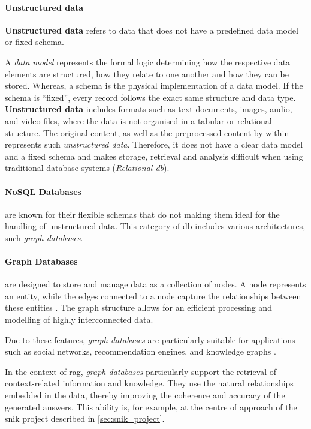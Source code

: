 \paragraph{Unstructured data}\label{par:unstr_data}
%
\begin{definition}\label{def:unstr_data}
    \textbf{Unstructured data} refers to data that does not have a predefined data model or fixed schema.
\end{definition}
%
A \textit{data model} represents the formal logic determining how the respective data elements are structured, how they relate to one another and how they can be stored.
Whereas, a schema is the physical implementation of a data model.
If the schema is \enquote{fixed}, every record follows the exact same structure and data type.
\textbf{Unstructured data} includes formats such as text documents, images, audio, and video files, where the data is not organised in a tabular or relational structure. 
The original content, as well as the preprocessed content by \citeauthor{Paul_Keller} within \citet{bb2} represents such \textit{unstructured data}.
Therefore, it does not have a clear data model and a fixed schema and makes storage, retrieval and analysis difficult when using traditional database systems (\textit{Relational \ac{db}}).
%
\paragraph{NoSQL Databases}\label{par:nosql_db} are known for their flexible schemas that do not making them ideal for the handling of unstructured data.
This category of \ac{db} includes various architectures, such \textit{graph databases}.
%
\paragraph{Graph Databases}\label{par:graph_db} are designed to store and manage data as a collection of nodes.
A node represents an entity, while the edges connected to a node capture the relationships between these entities \citep{Robinson2015}.
The graph structure allows for an efficient processing and modelling of highly interconnected data.

Due to these features, \textit{graph databases} are particularly suitable for applications such as social networks, recommendation engines, and knowledge graphs \citep{Angles2008}.

In the context of \ac{rag}, \textit{graph databases} particularly support the retrieval of context-related information and knowledge.
They use the natural relationships embedded in the data, thereby improving the coherence and accuracy of the generated answers.
%
This ability is, for example, at the centre of approach of the \ac{snik} project described in \cref{sec:snik_project}.
%
